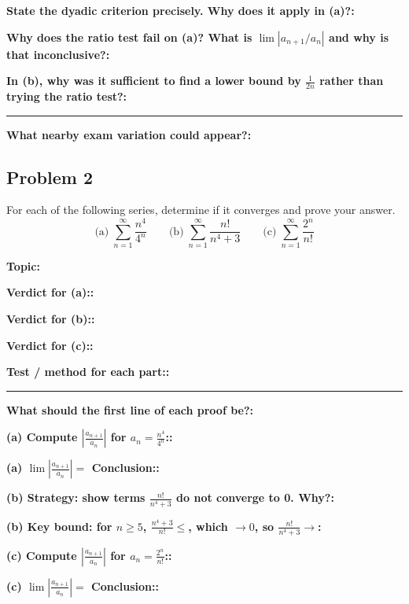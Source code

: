 \documentclass[12pt]{article}
\newcommand{\fillfield}[1]{%
  \par\noindent\textbf{#1:}\enspace\hrulefill\par\vspace{3pt}%
}
\newcommand{\fillfieldlong}[1]{%
  \par\noindent\textbf{#1:}\par\vspace{1.5cm}%
  \noindent\rule{\linewidth}{0.35pt}\par\vspace{4pt}%
}
\begin{document}
\bigskip

\begin{tcolorbox}[
  enhanced, breakable,
  colback  = reflectcyan,
  colframe = cyan!55!black,
  fonttitle = \bfseries,
  title = {\textsc{Reflection \& Variation}}
]
\fillfield{State the dyadic criterion precisely. Why does it apply in (a)?}
\fillfield{Why does the ratio test fail on (a)? What is $\lim|a_{n+1}/a_n|$ and why is that inconclusive?}
\fillfieldlong{In (b), why was it sufficient to find a lower bound by $\frac{1}{2n}$ rather than trying the ratio test?}
\fillfield{What nearby exam variation could appear?}
\end{tcolorbox}

\newpage
\subsection{Problem 2}

\begin{tcolorbox}[
  enhanced, breakable,
  colback  = probblue,
  colframe = blue!55!black,
  fonttitle = \bfseries,
  title = {\textsc{Problem Statement}\hfill Homework 7, Problem 2}
]
For each of the following series, determine if it converges and prove your answer.
\[
  \text{(a)}\;\sum_{n=1}^{\infty}\frac{n^4}{4^n}
  \qquad
  \text{(b)}\;\sum_{n=1}^{\infty}\frac{n!}{n^4+3}
  \qquad
  \text{(c)}\;\sum_{n=1}^{\infty}\frac{2^n}{n!}
\]
\end{tcolorbox}

\bigskip

\begin{tcolorbox}[
  enhanced, breakable,
  colback  = pass1green,
  colframe = green!55!black,
  fonttitle = \bfseries,
  title = {Pass 1 \enspace\textbf{--}\enspace First Diagnosis}
]
\fillfield{Topic}
\fillfield{Verdict for (a):}
\fillfield{Verdict for (b):}
\fillfield{Verdict for (c):}
\fillfieldlong{Test / method for each part:}
\fillfield{What should the first line of each proof be?}
\end{tcolorbox}

\bigskip

\begin{tcolorbox}[
  enhanced, breakable,
  colback  = pass2yellow,
  colframe = yellow!65!black,
  fonttitle = \bfseries,
  title = {Pass 2 \enspace\textbf{--}\enspace Proof Recipe Card}
]
\fillfield{(a) Compute $\left|\frac{a_{n+1}}{a_n}\right|$ for $a_n = \frac{n^4}{4^n}$:}
\fillfield{(a) $\lim\left|\frac{a_{n+1}}{a_n}\right|=$\hspace{1cm} Conclusion:}
\fillfield{(b) Strategy: show terms $\frac{n!}{n^4+3}$ do not converge to 0. Why?}
\fillfield{(b) Key bound: for $n \geq 5$, $\frac{n^4+3}{n!} \leq$\hrulefill, which $\to 0$, so $\frac{n!}{n^4+3} \to$}
\fillfield{(c) Compute $\left|\frac{a_{n+1}}{a_n}\right|$ for $a_n = \frac{2^n}{n!}$:}
\fillfield{(c) $\lim\left|\frac{a_{n+1}}{a_n}\right|=$\hspace{1cm} Conclusion:}
\end{tcolorbox}
\end{document}
